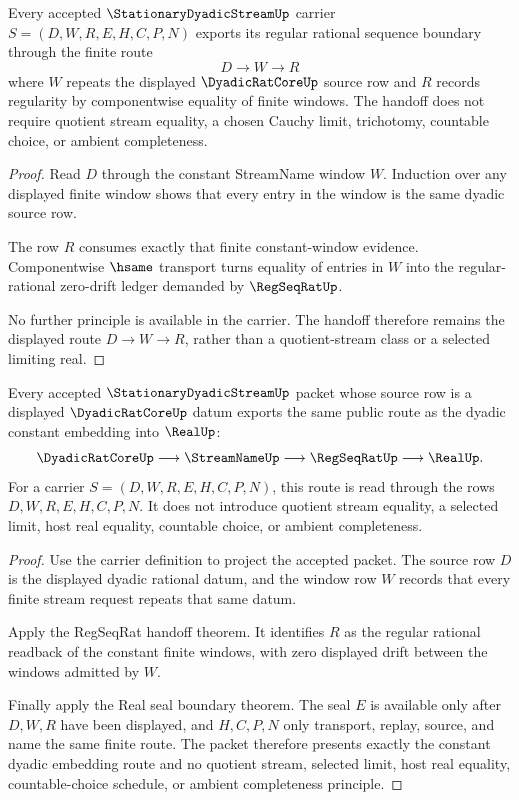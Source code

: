 \begin{theorem}
\label{thm:stationary-dyadic-stream-regseqrat-handoff}
Every accepted $\StationaryDyadicStreamUp$ carrier $S=(D,W,R,E,H,C,P,N)$ exports its regular rational sequence boundary through the finite route
$$
D \longrightarrow W \longrightarrow R
$$
where $W$ repeats the displayed $\DyadicRatCoreUp$ source row and $R$ records regularity by componentwise equality of finite windows. The handoff does not require quotient stream equality, a chosen Cauchy limit, trichotomy, countable choice, or ambient completeness.
\end{theorem}
\begin{proof}
Read $D$ through the constant StreamName window $W$. Induction over any displayed finite window shows that every entry in the window is the same dyadic source row.

The row $R$ consumes exactly that finite constant-window evidence. Componentwise $\hsame$ transport turns equality of entries in $W$ into the regular-rational zero-drift ledger demanded by $\RegSeqRatUp$.

No further principle is available in the carrier. The handoff therefore remains the displayed route $D \to W \to R$, rather than a quotient-stream class or a selected limiting real.
\end{proof}

\begin{theorem}
\label{thm:stationary-dyadic-stream-constant-embedding}
Every accepted $\StationaryDyadicStreamUp$ packet whose source row is a displayed $\DyadicRatCoreUp$ datum exports the same public route as the dyadic constant embedding into $\RealUp$:
$$
\DyadicRatCoreUp \longrightarrow \StreamNameUp \longrightarrow \RegSeqRatUp \longrightarrow \RealUp .
$$
For a carrier $S=(D,W,R,E,H,C,P,N)$, this route is read through the rows $D,W,R,E,H,C,P,N$. It does not introduce quotient stream equality, a selected limit, host real equality, countable choice, or ambient completeness.
\end{theorem}
\begin{proof}
Use the carrier definition to project the accepted packet. The source row $D$ is the displayed dyadic rational datum, and the window row $W$ records that every finite stream request repeats that same datum.

Apply the RegSeqRat handoff theorem. It identifies $R$ as the regular rational readback of the constant finite windows, with zero displayed drift between the windows admitted by $W$.

Finally apply the Real seal boundary theorem. The seal $E$ is available only after $D,W,R$ have been displayed, and $H,C,P,N$ only transport, replay, source, and name the same finite route. The packet therefore presents exactly the constant dyadic embedding route and no quotient stream, selected limit, host real equality, countable-choice schedule, or ambient completeness principle.
\end{proof}

